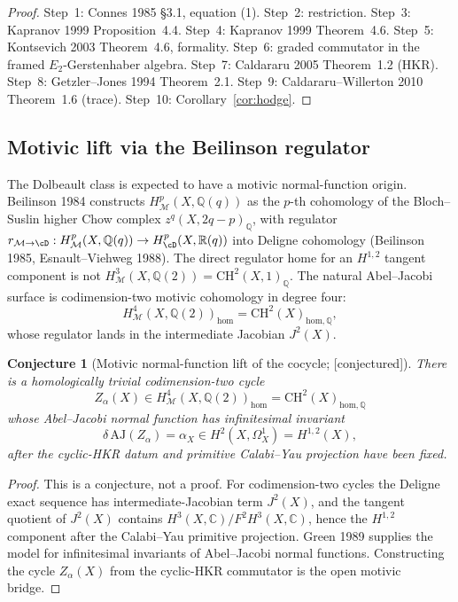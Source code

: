 \documentclass[11pt,reqno]{amsart}
\theoremstyle{plain}
\newtheorem{conjecture}[theorem]{Conjecture}
\theoremstyle{definition}
\theoremstyle{remark}
\providecommand{\ClaimStatusConjectured}{\textnormal{[conjectured]}}
\newcommand{\Cbb}{\mathbb{C}}
\newcommand{\Rbb}{\mathbb{R}}
\newcommand{\Qbb}{\mathbb{Q}}
\newcommand{\cM}{\mathcal{M}}
\begin{document}
\begin{proof}
Step~1: Connes 1985 \S3.1, equation (1). Step~2: restriction. Step~3: Kapranov 1999 Proposition~4.4. Step~4: Kapranov 1999 Theorem~4.6. Step~5: Kontsevich 2003 Theorem~4.6, formality. Step~6: graded commutator in the framed $E_2$-Gerstenhaber algebra. Step~7: Caldararu 2005 Theorem~1.2 (HKR). Step~8: Getzler--Jones 1994 Theorem~2.1. Step~9: Caldararu--Willerton 2010 Theorem~1.6 (trace). Step~10: Corollary~\ref{cor:hodge}.
\end{proof}

\subsection{Motivic lift via the Beilinson regulator}
\label{sub:motivic-regulator}
The Dolbeault class is expected to have a motivic normal-function
origin. Beilinson 1984 constructs $H^p_{\cM}(X, \Qbb(q))$ as the
$p$-th cohomology of the Bloch--Suslin higher Chow complex
$z^q(X, 2q-p)_{\Qbb}$, with regulator
$r_{\cM \to \cD}: H^p_{\cM}(X, \Qbb(q)) \to H^p_{\cD}(X, \Rbb(q))$
into Deligne cohomology (Beilinson 1985, Esnault--Viehweg 1988).
The direct regulator home for an $H^{1,2}$ tangent component is not
$H^3_{\cM}(X,\Qbb(2))=\mathrm{CH}^2(X,1)_{\Qbb}$. The natural
Abel--Jacobi surface is codimension-two motivic cohomology in degree
four:
\[
  H^4_{\cM}(X,\Qbb(2))_{\mathrm{hom}}
  =
  \mathrm{CH}^2(X)_{\mathrm{hom},\Qbb},
\]
whose regulator lands in the intermediate Jacobian $J^2(X)$.

\begin{conjecture}[Motivic normal-function lift of the cocycle; \ClaimStatusConjectured]
\label{prop:motivic-lift}
There is a homologically trivial codimension-two cycle
\[
  Z_\alpha(X)\in
  H^4_{\cM}(X,\Qbb(2))_{\mathrm{hom}}
  =
  \mathrm{CH}^2(X)_{\mathrm{hom},\Qbb}
\]
whose Abel--Jacobi normal function has infinitesimal invariant
\[
  \delta\,\mathrm{AJ}(Z_\alpha)=\alpha_X
  \in H^2(X,\Omega_X^1)=H^{1,2}(X),
\]
after the cyclic-HKR datum and primitive Calabi--Yau projection have
been fixed.
\end{conjecture}

\begin{proof}
This is a conjecture, not a proof. For codimension-two cycles the
Deligne exact sequence has intermediate-Jacobian term $J^2(X)$, and
the tangent quotient of $J^2(X)$ contains
$H^3(X,\Cbb)/F^2H^3(X,\Cbb)$, hence the $H^{1,2}$ component after the
Calabi--Yau primitive projection. Green 1989 supplies the model for
infinitesimal invariants of Abel--Jacobi normal functions. Constructing
the cycle $Z_\alpha(X)$ from the cyclic-HKR commutator is the open
motivic bridge.
\end{proof}
\end{document}
